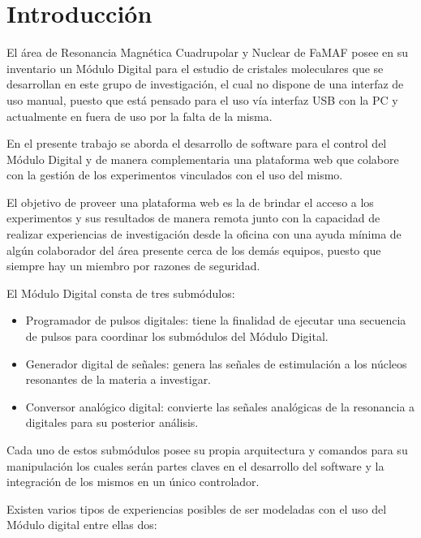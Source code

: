 \section{Introducci\'on}

El \'area de Resonancia Magn\'etica Cuadrupolar
y Nuclear de FaMAF posee en su inventario un M\'odulo Digital
para el estudio de cristales moleculares que se desarrollan 
en este grupo de investigaci\'on, el cual no dispone de una 
interfaz de uso manual, puesto que est\'a pensado para el 
uso v\'ia interfaz USB con la PC y actualmente en fuera 
de uso por la falta de la misma.

En el presente trabajo se aborda el desarrollo de software para
el control del M\'odulo Digital y de manera complementaria una
plataforma web que colabore con la gesti\'on de los experimentos 
vinculados con el uso del mismo.

El objetivo de proveer una plataforma web es la de brindar el acceso 
a los experimentos y sus resultados de manera remota junto con 
la capacidad de realizar experiencias de investigaci\'on desde la oficina
con una ayuda m\'inima de alg\'un colaborador del \'area presente cerca
de los dem\'as equipos, puesto que siempre hay un miembro por razones de seguridad.

El Módulo Digital consta de tres submódulos:

\begin{itemize}

   \item Programador de pulsos digitales: tiene la finalidad 
   de ejecutar una secuencia de pulsos para coordinar los 
   subm\'odulos del M\'odulo Digital.

   \item Generador digital de se\~nales: genera las se\~nales de 
   estimulaci\'on a los n\'ucleos resonantes de la materia a investigar.

   \item Conversor anal\'ogico digital: convierte las 
   se\~nales anal\'ogicas de la resonancia a digitales
   para su posterior an\'alisis.

\end{itemize}

Cada uno de estos subm\'odulos posee su propia arquitectura y comandos 
para su manipulaci\'on los cuales ser\'an partes claves en el desarrollo del 
software y la integraci\'on de los mismos en un \'unico controlador.

Existen varios tipos de experiencias posibles de ser modeladas 
con el uso del M\'odulo digital entre ellas dos:

